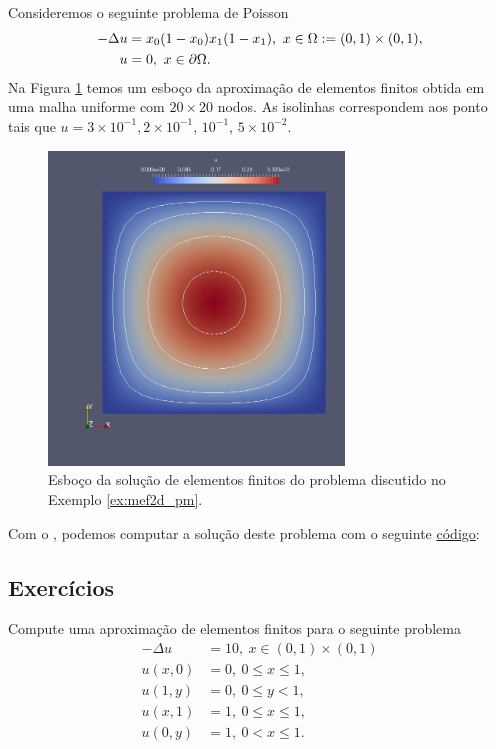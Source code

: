 \begin{ex}\label{ex:mef2d_pm}
  Consideremos o seguinte problema de Poisson
  \begin{align}
    -\Delta u &= x_0(1-x_0)x_1(1-x_1),~x\in\Omega:=(0, 1)\times (0, 1),\\
    u &= 0,~x\in\partial\Omega.
  \end{align}
  Na Figura \ref{fig:mef2d_pm} temos um esboço da aproximação de elementos finitos obtida em uma malha uniforme com $20\times 20$ nodos. As isolinhas correspondem aos ponto tais que $u=3\times 10^{-1}, 2\times 10^{-1}$, $10^{-1}$, $5\times 10^{-2}$.

  \begin{figure}[h!]
    \centering
    \includegraphics[width=0.7\textwidth]{./cap_mef2d/dados/ex_mef2d_pm/fig_mef2d_pm}
    \caption{Esboço da solução de elementos finitos do problema discutido no Exemplo \ref{ex:mef2d_pm}.}
    \label{fig:mef2d_pm}
  \end{figure}

\ifispython
Com o \fenics, podemos computar a solução deste problema com o seguinte \href{https://github.com/phkonzen/notas/blob/master/src/MetodoElementosFinitos/cap_mef2d/dados/ex_mef2d_pm/ex_mef2d_pm.py}{código}:

\fi
\end{ex}

\subsection*{Exercícios}

\begin{exer}
  Compute uma aproximação de elementos finitos para o seguinte problema
\begin{align}
  -\Delta u &= 10,~x\in (0, 1)\times (0, 1)\\
  u(x,0) &= 0,~0\leq x \leq 1,\\
  u(1,y) &= 0,~0\leq y < 1,\\
  u(x,1) &= 1,~0\leq x \leq 1,\\
  u(0,y) &= 1,~0<x\leq 1.
\end{align}
\end{exer}